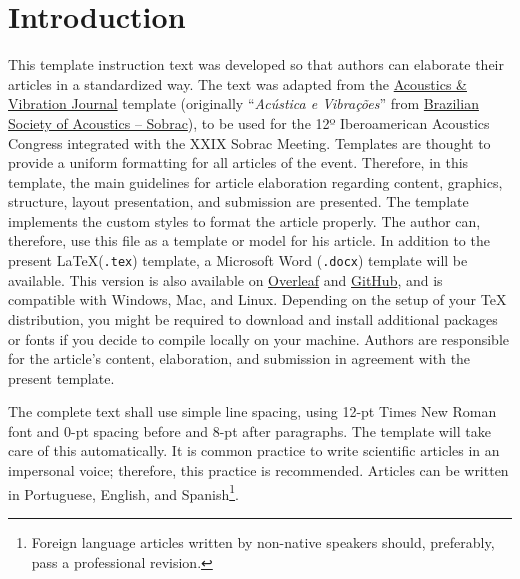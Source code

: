 \documentclass[12pt, a4paper, twoside, twocolumn]{article}
\begin{document}
 \setcounter{page}{1} 
\clearpage %

\section{Introduction}

This template instruction text was developed so that authors can elaborate their articles in a standardized way. The text was adapted from the \href{https://revista.acustica.org.br/acustica/user/setLocale/en_US?source=%2Facustica}{Acoustics \& Vibration Journal} template (originally ``\textit{Acústica e Vibrações}'' from \href{https://www.acustica.org.br/}{Brazilian Society of Acoustics -- Sobrac}), to be used for the 12º Iberoamerican Acoustics Congress integrated with the XXIX Sobrac Meeting. Templates are thought to provide a uniform formatting for all articles of the event. Therefore, in this template, the main guidelines for article elaboration regarding content, graphics, structure, layout presentation, and submission are presented. The template implements the custom styles to format the article properly. The author can, therefore, use this file as a template or model for his article. In addition to the present \LaTeX\xspace (\texttt{.tex}) template, a  Microsoft Word (\texttt{.docx}) template will be available. This version is also available on \href{https://www.overleaf.com/read/hgryywpgmxdx}{Overleaf} and \href{https://github.com/willdfonseca/fia2020}{GitHub}, and is compatible with Windows, Mac, and Linux. Depending on the setup of your TeX distribution, you might be required to download and install additional packages or fonts if you decide to compile locally on your machine. 
Authors are responsible for the article's content, elaboration, and submission in agreement with the present template.

The complete text shall use simple line spacing, using 12-pt Times New Roman font and 0-pt spacing before and 8-pt after paragraphs. The template will take care of this automatically. 
It is common practice to write scientific articles in an impersonal voice; therefore, this practice is recommended. Articles can be written in Portuguese, English, and Spanish\footnote{Foreign language articles written by non-native speakers should, preferably, pass a professional revision.}.
\end{document}
